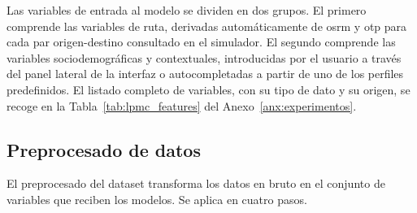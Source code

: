 Las variables de entrada al modelo se dividen en dos grupos. El primero comprende las variables de ruta, derivadas automáticamente de \gls{osrm} y \gls{otp} para cada par origen-destino consultado en el simulador. El segundo comprende las variables sociodemográficas y contextuales, introducidas por el usuario a través del panel lateral de la interfaz o autocompletadas a partir de uno de los perfiles predefinidos. El listado completo de variables, con su tipo de dato y su origen, se recoge en la Tabla~\ref{tab:lpmc_features} del Anexo~\ref{anx:experimentos}.

\subsection{Preprocesado de datos}
\label{subsec:impl_lpmc_preprocesado}

El preprocesado del dataset transforma los datos en bruto en el conjunto de variables que reciben los modelos. Se aplica en cuatro pasos.

